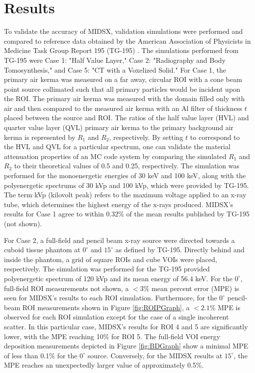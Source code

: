 \section{Results}
\par To validate the accuracy of MIDSX, validation simulations were performed and compared to reference data obtained by the American Association of Physicists in Medicine Task Group Report 195 (TG-195) \cite{sechopoulos_monte_2015}. The simulations performed from TG-195 were Case 1: "Half Value Layer," Case 2: "Radiography and Body Tomosynthesis," and Case 5: "CT with a Voxelized Solid." For Case 1, the primary air kerma was measured on a far away, circular ROI with a cone beam point source collimated such that all primary particles would be incident upon the ROI. The primary air kerma was measured with the domain filled only with air and then compared to the measured air kerma with an Al filter of thickness $t$ placed between the source and ROI. The ratios of the half value layer (HVL) and quarter value layer (QVL) primary air kerma to the primary background air kerma is represented by $R_1$ and $R_2$, respectively. By setting $t$ to correspond to the HVL and QVL for a particular spectrum, one can validate the material attenuation properties of an MC code system by comparing the simulated $R_1$ and $R_2$ to their theoretical values of 0.5 and 0.25, respectively. The simulation was performed for the monoenergetic energies of 30 keV and 100 keV, along with the polyenergetic spectrums of 30 kVp and 100 kVp, which were provided by TG-195. The term kVp (kilovolt peak) refers to the maximum voltage applied to an x-ray tube, which determines the highest energy of the x-rays produced. MIDSX's results for Case 1 agree to within 0.32\% of the mean results published by TG-195 (not shown).
\par For Case 2, a full-field and pencil beam x-ray source were directed towards a cuboid tissue phantom at $0^\circ$ and $15^\circ$ as defined by TG-195. Directly behind and inside the phantom, a grid of square ROIs and cube VOIs were placed, respectively. The simulation was performed for the TG-195 provided polyenergetic spectrum of 120 kVp and its mean energy of 56.4 keV. For the $0^\circ$, full-field ROI measurements not shown, a $<3$\% mean percent error (MPE) is seen for MIDSX's results to each ROI simulation. Furthermore, for the $0^\circ$ pencil-beam ROI measurements shown in Figure \ref{fig:ROIPGraph}, a $<2.1$\% MPE is observed for each ROI simulation except for the case of a single incoherent scatter. In this particular case, MIDSX's results for ROI 4 and 5 are significantly lower, with the MPE reaching 10\% for ROI 5. The full-field VOI energy deposition measurements depicted in Figure \ref{fig:BDGraph} show a minimal MPE of less than 0.1\% for the $0^\circ$ source. Conversely, for the MIDSX results at $15^\circ$, the MPE reaches an unexpectedly larger value of approximately 0.5\%.
